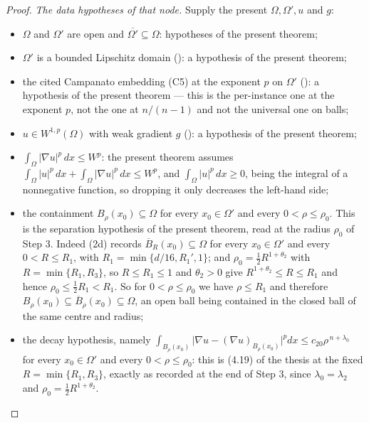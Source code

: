 \begin{proof}
\emph{The data hypotheses of that node.}  Supply the present $\Omega,\Omega',u$
and $g$:
\begin{itemize}
\item $\Omega$ and $\Omega'$ are open and $\overline{\Omega'}\subseteq\Omega$:
  hypotheses of the present theorem;
\item $\Omega'$ is a bounded Lipschitz domain
  (): a hypothesis of the present theorem;
\item the cited Campanato embedding (C5) at the exponent $p$ on $\Omega'$
  (): a hypothesis of the present theorem ---
  this is the per-instance one at the exponent $p$, not the one at $n/(n-1)$ and
  not the universal one on balls;
\item $u\in W^{1,p}(\Omega)$ with weak gradient $g$ (): a
  hypothesis of the present theorem;
\item $\int_\Omega|\nabla u|^p\,dx\le W^p$: the present theorem assumes
  $\int_\Omega|u|^p\,dx+\int_\Omega|\nabla u|^p\,dx\le W^p$, and
  $\int_\Omega|u|^p\,dx\ge0$, being the integral of a nonnegative function, so
  dropping it only decreases the left-hand side;
\item the containment $B_\rho(x_0)\subseteq\Omega$ for every $x_0\in\Omega'$ and
  every $0<\rho\le\rho_0$.  This is the separation hypothesis of the present
  theorem, read at the radius $\rho_0$ of Step 3.  Indeed (2d) records
  $\overline B_R(x_0)\subseteq\Omega$ for every $x_0\in\Omega'$ and every
  $0<R\le R_1$, with $R_1=\min\{d/16,R_1',1\}$; and
  $\rho_0=\tfrac12R^{1+\theta_2}$ with $R=\min\{R_1,R_3\}$, so $R\le R_1\le1$
  and $\theta_2>0$ give $R^{1+\theta_2}\le R\le R_1$ and hence
  $\rho_0\le\tfrac12R_1<R_1$.  So for $0<\rho\le\rho_0$ we have $\rho\le R_1$
  and therefore
  $B_\rho(x_0)\subseteq\overline B_\rho(x_0)\subseteq\Omega$, an open ball being
  contained in the closed ball of the same centre and radius;
\item the decay hypothesis, namely
  $\int_{B_\rho(x_0)}\bigl|\nabla u-(\nabla u)_{B_\rho(x_0)}\bigr|^pdx\le
  c_{20}\rho^{\,n+\lambda_0}$ for every $x_0\in\Omega'$ and every
  $0<\rho\le\rho_0$: this is (4.19) of the thesis at the fixed
  $R=\min\{R_1,R_3\}$, exactly as recorded at the end of Step 3, since
  $\lambda_0=\lambda_2$ and $\rho_0=\tfrac12R^{1+\theta_2}$.
\end{itemize}


\end{proof}
